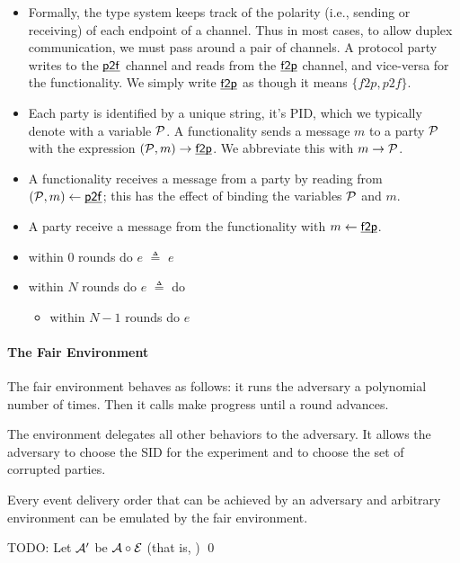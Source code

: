 \begin{itemize}
 \item Formally, the type system keeps track of the polarity (i.e., sending or receiving) of each endpoint of a channel. Thus in most cases, to allow duplex communication, we must pass around a pair of channels. A protocol party writes to the $\chan{p2f}$ channel and reads from the $\chan{f2p}$ channel, and vice-versa for the functionality. We simply write $\chan{f2p}$ as though it means $\{f2p,p2f\}$.

 \item Each party is identified by a unique string, it's PID, which we typically denote with a variable $\P$. A functionality sends a message $m$ to a party $\P$ with the expression $(\P,m) \rightarrow \chan{f2p}$. We abbreviate this with $m \rightarrow \P$.
 \item A functionality receives a message from a party by reading from $(\P,m) \leftarrow \chan{p2f}$; this has the effect of binding the variables $\P$ and $m$.
 \item A party receive a message from the functionality with $m \leftarrow \chan{f2p}$.
 \item within $0$ rounds do $e$ $\triangleq$ $e$
 \item[] within $N$ rounds do $e$ $\triangleq$  do
   \begin{itemize}[leftmargin=40mm]
   \item[] within $N-1$ rounds do $e$
   \end{itemize}
\end{itemize}


\paragraph{The Fair Environment}

The fair environment behaves as follows: it runs the adversary a polynomial number of times. Then it calls make progress until a round advances.

The environment delegates all other behaviors to the adversary. It allows the adversary to choose the SID for the experiment and to choose the set of corrupted parties.

\begin{theorem}
Every event delivery order that can be achieved by an adversary and arbitrary environment can be emulated by the fair environment.
\end{theorem}
\proof
TODO: Let $\A'$ be $\A \circ \Z$ (that is, )
\qed

